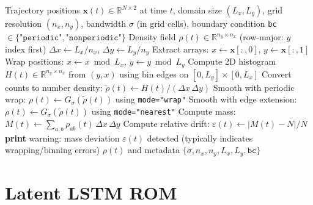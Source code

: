 \begin{breakablealgorithm}
\caption{Fast gridded Gaussian KDE (histogram + Gaussian smoothing)}
\label{alg:kde_hist_gauss}
{\footnotesize
\begin{algorithmic}[1]
\Require Trajectory positions $\mathbf{x}(t)\in\mathbb{R}^{N\times 2}$ at time $t$,
domain size $(L_x,L_y)$, grid resolution $(n_x,n_y)$,
bandwidth $\sigma$ (in grid cells), boundary condition \texttt{bc} $\in\{\texttt{"periodic"},\texttt{"nonperiodic"}\}$
\Ensure Density field $\rho(t)\in\mathbb{R}^{n_y\times n_x}$ (row-major: $y$ index first)
\State $\Delta x\gets L_x/n_x$, $\Delta y\gets L_y/n_y$
\State Extract arrays: $x\gets\mathbf{x}[:,0]$, $y\gets\mathbf{x}[:,1]$
  \State Wrap positions: $x\gets x\bmod L_x$, $y\gets y\bmod L_y$
\EndIf
\State Compute 2D histogram $H(t)\in\mathbb{R}^{n_y\times n_x}$ from $(y,x)$ using bin edges on $[0,L_y]\times[0,L_x]$
\State Convert counts to number density: $\tilde\rho(t)\gets H(t)/(\Delta x\,\Delta y)$
  \State Smooth with periodic wrap: $\rho(t)\gets G_\sigma(\tilde\rho(t))$ using \texttt{mode="wrap"}
\Else
  \State Smooth with edge extension: $\rho(t)\gets G_\sigma(\tilde\rho(t))$ using \texttt{mode="nearest"}
\EndIf
\State Compute mass: $M(t)\gets\sum_{a,b}\rho_{ab}(t)\,\Delta x\,\Delta y$
\State Compute relative drift: $\varepsilon(t)\gets |M(t)-N|/N$
  \State \textbf{print} warning: mass deviation $\varepsilon(t)$ detected (typically indicates wrapping/binning errors)
\EndIf
\State \Return $\rho(t)$ and metadata $\{\sigma,n_x,n_y,L_x,L_y,\texttt{bc}\}$
\end{algorithmic}
}
\end{breakablealgorithm}

\section{Latent LSTM ROM}
\label{sec:app_lstm}

